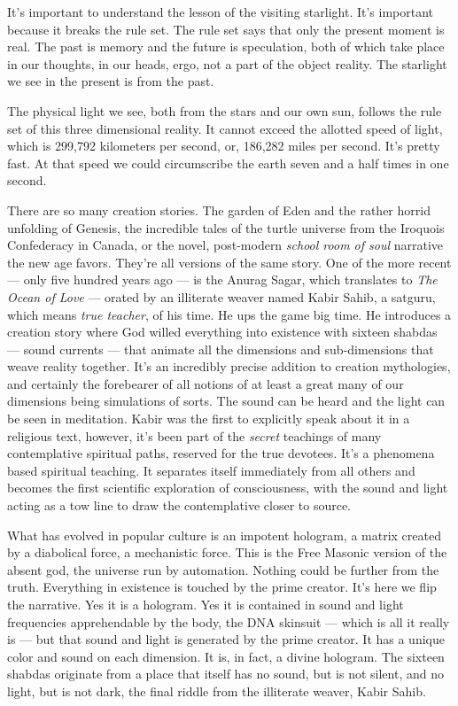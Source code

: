 \documentclass[letterpaper,11pt,twoside,titlepage,onecolumn,openany]{book}
\begin{document}
It's important to understand the lesson of the visiting starlight. It's
important because it breaks the rule set. The rule set says that only
the present moment is real. The past is memory and the future is
speculation, both of which take place in our thoughts, in our heads,
ergo, not a part of the object reality. The starlight we see in the
present is from the past.

The physical light we see, both from the stars and our own sun, follows
the rule set of this three dimensional reality. It cannot exceed the
allotted speed of light, which is 299,792 kilometers per second, or,
186,282 miles per second. It's pretty fast. At that speed we could
circumscribe the earth seven and a half times in one second.

There are so many creation stories. The garden of Eden and the rather
horrid unfolding of Genesis, the incredible tales of the turtle universe
from the Iroquois Confederacy in Canada, or the novel, post-modern
\emph{school room of soul} narrative the new age favors. They're all
versions of the same story. One of the more recent --- only five hundred
years ago --- is the Anurag Sagar, which translates to \emph{The Ocean
of Love} --- orated by an illiterate weaver named Kabir Sahib, a
satguru, which means \emph{true teacher}, of his time. He ups the game
big time. He introduces a creation story where God willed everything
into existence with sixteen shabdas --- sound currents --- that animate
all the dimensions and sub-dimensions that weave reality together. It's
an incredibly precise addition to creation mythologies, and certainly
the forebearer of all notions of at least a great many of our dimensions
being simulations of sorts. The sound can be heard and the light can be
seen in meditation. Kabir was the first to explicitly speak about it in
a religious text, however, it's been part of the \emph{secret} teachings
of many contemplative spiritual paths, reserved for the true devotees.
It's a phenomena based spiritual teaching. It separates itself
immediately from all others and becomes the first scientific exploration
of consciousness, with the sound and light acting as a tow line to draw
the contemplative closer to source.

What has evolved in popular culture is an impotent hologram, a matrix
created by a diabolical force, a mechanistic force. This is the Free
Masonic version of the absent god, the universe run by automation.
Nothing could be further from the truth. Everything in existence is
touched by the prime creator. It's here we flip the narrative. Yes it is
a hologram. Yes it is contained in sound and light frequencies
apprehendable by the body, the DNA skinsuit --- which is all it really
is --- but that sound and light is generated by the prime creator. It
has a unique color and sound on each dimension. It is, in fact, a divine
hologram. The sixteen shabdas originate from a place that itself has no
sound, but is not silent, and no light, but is not dark, the final
riddle from the illiterate weaver, Kabir Sahib.
\end{document}

